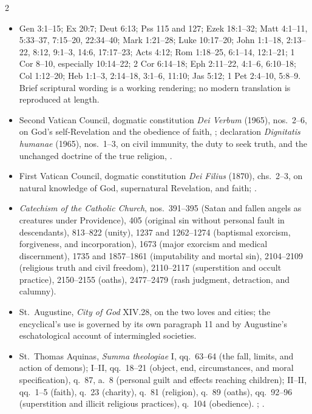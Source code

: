 \begin{multicols}{2}
{\footnotesize
\begin{itemize}[itemsep=0.1em,topsep=0.15em]
\item Gen 3:1--15; Ex 20:7; Deut 6:13; Pss 115 and 127; Ezek 18:1--32; Matt 4:1--11, 5:33--37, 7:15--20, 22:34--40; Mark 1:21--28; Luke 10:17--20; John 1:1--18, 2:13--22, 8:12, 9:1--3, 14:6, 17:17--23; Acts 4:12; Rom 1:18--25, 6:1--14, 12:1--21; 1 Cor 8--10, especially 10:14--22; 2 Cor 6:14--18; Eph 2:11--22, 4:1--6, 6:10--18; Col 1:12--20; Heb 1:1--3, 2:14--18, 3:1--6, 11:10; Jas 5:12; 1 Pet 2:4--10, 5:8--9. Brief scriptural wording is a working rendering; no modern translation is reproduced at length.
\item Second Vatican Council, dogmatic constitution \emph{Dei Verbum} (1965), nos.~2--6, on God's self-Revelation and the obedience of faith, ; declaration \emph{Dignitatis humanae} (1965), nos.~1--3, on civil immunity, the duty to seek truth, and the unchanged doctrine of the true religion, .
\item First Vatican Council, dogmatic constitution \emph{Dei Filius} (1870), chs.~2--3, on natural knowledge of God, supernatural Revelation, and faith; .
\item \emph{Catechism of the Catholic Church}, nos.~391--395 (Satan and fallen angels as creatures under Providence), 405 (original sin without personal fault in descendants), 813--822 (unity), 1237 and 1262--1274 (baptismal exorcism, forgiveness, and incorporation), 1673 (major exorcism and medical discernment), 1735 and 1857--1861 (imputability and mortal sin), 2104--2109 (religious truth and civil freedom), 2110--2117 (superstition and occult practice), 2150--2155 (oaths), 2477--2479 (rash judgment, detraction, and calumny).
\item St.~Augustine, \emph{City of God} XIV.28, on the two loves and cities; the encyclical's use is governed by its own paragraph 11 and by Augustine's eschatological account of intermingled societies.
\item St.~Thomas Aquinas, \emph{Summa theologiae} I, qq.~63--64 (the fall, limits, and action of demons); I--II, qq.~18--21 (object, end, circumstances, and moral specification), q.~87, a.~8 (personal guilt and effects reaching children); II--II, qq.~1--5 (faith), q.~23 (charity), q.~81 (religion), q.~89 (oaths), qq.~92--96 (superstition and illicit religious practices), q.~104 (obedience). ; .
\end{itemize}}


\end{multicols}
